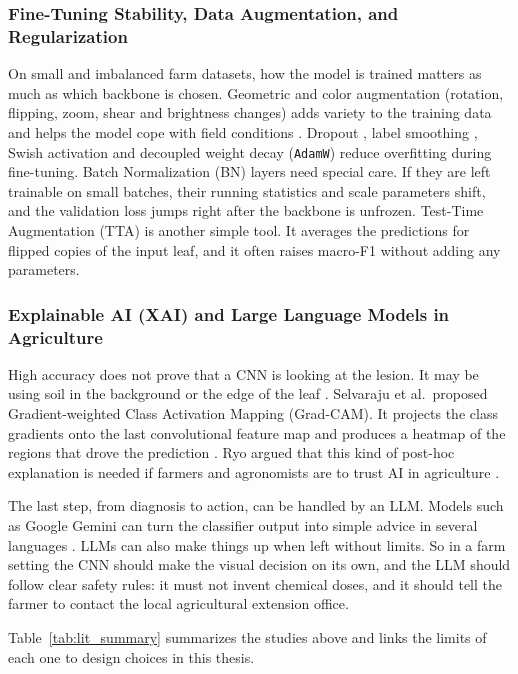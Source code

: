 \subsubsection{Fine-Tuning Stability, Data Augmentation, and Regularization}
On small and imbalanced farm datasets, how the model is trained matters as much as which backbone is chosen. Geometric and color augmentation (rotation, flipping, zoom, shear and brightness changes) adds variety to the training data and helps the model cope with field conditions \cite{shorten2019survey}. Dropout \cite{srivastava2014dropout}, label smoothing \cite{szegedy2016rethinking}, Swish activation \cite{ramachandran2017swish} and decoupled weight decay (\texttt{AdamW}) \cite{loshchilov2019decoupled} reduce overfitting during fine-tuning. Batch Normalization (BN) layers \cite{ioffe2015batch} need special care. If they are left trainable on small batches, their running statistics and scale parameters shift, and the validation loss jumps right after the backbone is unfrozen. Test-Time Augmentation (TTA) is another simple tool. It averages the predictions for flipped copies of the input leaf, and it often raises macro-F1 without adding any parameters.

\subsubsection{Explainable AI (XAI) and Large Language Models in Agriculture}
High accuracy does not prove that a CNN is looking at the lesion. It may be using soil in the background or the edge of the leaf \cite{amara2017deep}. Selvaraju et al.\ proposed Gradient-weighted Class Activation Mapping (Grad-CAM). It projects the class gradients onto the last convolutional feature map and produces a heatmap of the regions that drove the prediction \cite{selvaraju2017grad}. Ryo argued that this kind of post-hoc explanation is needed if farmers and agronomists are to trust AI in agriculture \cite{ryo2022explainable}.

The last step, from diagnosis to action, can be handled by an LLM. Models such as Google Gemini can turn the classifier output into simple advice in several languages \cite{google2026gemini}. LLMs can also make things up when left without limits. So in a farm setting the CNN should make the visual decision on its own, and the LLM should follow clear safety rules: it must not invent chemical doses, and it should tell the farmer to contact the local agricultural extension office.

Table~\ref{tab:lit_summary} summarizes the studies above and links the limits of each one to design choices in this thesis.

